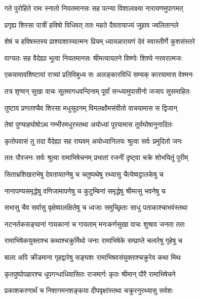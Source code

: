 
\twolineshloka
{गते पुरोहिते रामः स्नातो नियतमानसः}
{सह पत्न्या विशालाक्ष्या नारायणमुपागमत्} %

\twolineshloka
{प्रगृह्य शिरसा पात्रीं हविषो विधिवत् ततः}
{महते दैवतायाज्यं जुहाव ज्वलितानले} %

\twolineshloka
{शेषं च हविषस्तस्य प्राश्याशास्यात्मनः प्रियम्}
{ध्यायन्नारायणं देवं स्वास्तीर्णे कुशसंस्तरे} %

\twolineshloka
{वाग्यतः सह वैदेह्या भूत्वा नियतमानसः}
{श्रीमत्यायतने विष्णोः शिश्ये नरवरात्मजः} %

\twolineshloka
{एकयामावशिष्टायां रात्र्यां प्रतिविबुध्य सः}
{अलङ्कारविधिं सम्यक् कारयामास वेश्मनः} %

\twolineshloka
{तत्र शृण्वन् सुखा वाचः सूतमागधवन्दिनाम्}
{पूर्वां सन्ध्यामुपासीनो जजाप सुसमाहितः} %

\twolineshloka
{तुष्टाव प्रणतश्चैव शिरसा मधुसूदनम्}
{विमलक्षौमसंवीतो वाचयामास स द्विजान्} %

\twolineshloka
{तेषां पुण्याहघोषोऽथ गम्भीरमधुरस्तथा}
{अयोध्यां पूरयामास तूर्यघोषानुनादितः} %

\twolineshloka
{कृतोपवासं तु तदा वैदेह्या सह राघवम्}
{अयोध्यानिलयः श्रुत्वा सर्वः प्रमुदितो जनः} %

\twolineshloka
{ततः पौरजनः सर्वः श्रुत्वा रामाभिषेचनम्}
{प्रभातां रजनीं दृष्ट्वा चक्रे शोभयितुं पुरीम्} %

\twolineshloka
{सिताभ्रशिखराभेषु देवतायतनेषु च}
{चतुष्पथेषु रथ्यासु चैत्येष्वट्टालकेषु च} %

\twolineshloka
{नानापण्यसमृद्धेषु वणिजामापणेषु च}
{कुटुम्बिनां समृद्धेषु श्रीमत्सु भवनेषु च} %

\twolineshloka
{सभासु चैव सर्वासु वृक्षेष्वालक्षितेषु च}
{ध्वजाः समुच्छ्रिताः साधु पताकाश्चाभवंस्तथा} %

\twolineshloka
{नटनर्तकसङ्घानां गायकानां च गायताम्}
{मनःकर्णसुखा वाचः शुश्राव जनता ततः} %

\twolineshloka
{रामाभिषेकयुक्ताश्च कथाश्चक्रुर्मिथो जनाः}
{रामाभिषेके सम्प्राप्ते चत्वरेषु गृहेषु च} %

\twolineshloka
{बाला अपि क्रीडमाना गृहद्वारेषु सङ्घशः}
{रामाभिषवसंयुक्ताश्चक्रुरेव कथा मिथः} %

\twolineshloka
{कृतपुष्पोपहारश्च धूपगन्धाधिवासितः}
{राजमार्गः कृतः श्रीमान् पौरै रामाभिषेचने} %

\twolineshloka
{प्रकाशकरणार्थं च निशागमनशङ्कया}
{दीपवृक्षांस्तथा चक्रुरनुरथ्यासु सर्वशः} %

